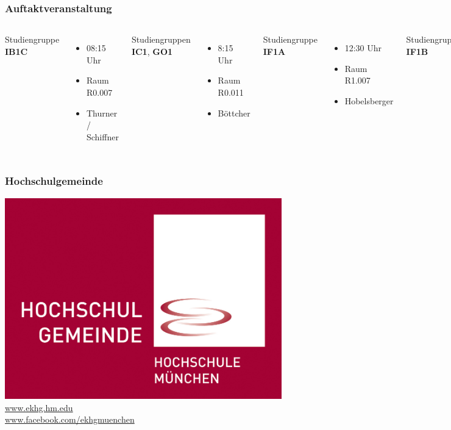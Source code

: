 \documentclass{beamer}
\begin{document}
    \begin{frame} 
    	\frametitle{Auftaktveranstaltung}
    	\begin{columns}
    		Studiengruppe \textbf{IB1C}
    		\begin{itemize}
    			\item 08:15 Uhr
    			\item Raum R0.007
    			\item Thurner / Schiffner
    		\end{itemize}
    		\bigskip
    		Studiengruppen \textbf{IC1}, \textbf{GO1}
    		\begin{itemize}
    			\item 8:15 Uhr
    			\item Raum R0.011
    			\item Böttcher
    		\end{itemize}
    		Studiengruppe \textbf{IF1A}
    		\begin{itemize}
    			\item 12:30 Uhr
    			\item Raum R1.007
    			\item Hobelsberger
    		\end{itemize}
    		\bigskip
    		Studiengruppe \textbf{IF1B}
    		\begin{itemize}
    			\item 12:30 Uhr
    			\item Raum R2.007
    			\item Orehek
    		\end{itemize}
    	\end{columns}
    \end{frame}
    
    \begin{frame} 
    	\frametitle{Hochschulgemeinde}
    	\includegraphics[width=0.9\textwidth]{ekhg.jpg}
    	\\
		\url{www.ekhg.hm.edu}
		\\
		\url{www.facebook.com/ekhgmuenchen}
    \end{frame}
    
\end{document}
